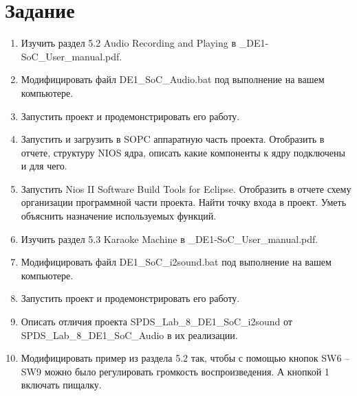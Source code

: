 \documentclass[a4paper,14pt]{article}
\begin{document}
	
	\tableofcontents
	\pagebreak
	\section{Задание}
	
	\begin{enumerate}
		
		\item Изучить раздел 5.2 Audio Recording and Playing в \_DE1-SoC\_User\_manual.pdf.
		
		\item Модифицировать файл DE1\_SoC\_Audio.bat под выполнение на вашем компьютере.
		
		\item Запустить проект и продемонстрировать его работу.
		
		\item Запустить и загрузить в SOPC аппаратную часть проекта. Отобразить в отчете, структуру NIOS ядра, описать какие компоненты к ядру подключены и для чего.
		
		\item Запустить Nios II Software Build Tools for Eclipse. Отобразить в отчете схему организации программной части проекта. Найти точку входа в проект. Уметь объяснить назначение используемых функций.
		
		\item Изучить раздел 5.3 Karaoke Machine в \_DE1-SoC\_User\_manual.pdf.
		
		\item Модифицировать файл DE1\_SoC\_i2sound.bat под выполнение на вашем компьютере.
		
		\item Запустить проект и продемонстрировать его работу.
		
		\item Описать отличия проекта SPDS\_Lab\_8\_DE1\_SoC\_i2sound от \\ SPDS\_Lab\_8\_DE1\_SoC\_Audio в их реализации.
		
		\item Модифицировать пример из раздела 5.2 так, чтобы с помощью кнопок SW6 – SW9 можно было регулировать громкость воспроизведения. А кнопкой 1 включать пищалку.
		
	\end{enumerate}

	
\end{document}
